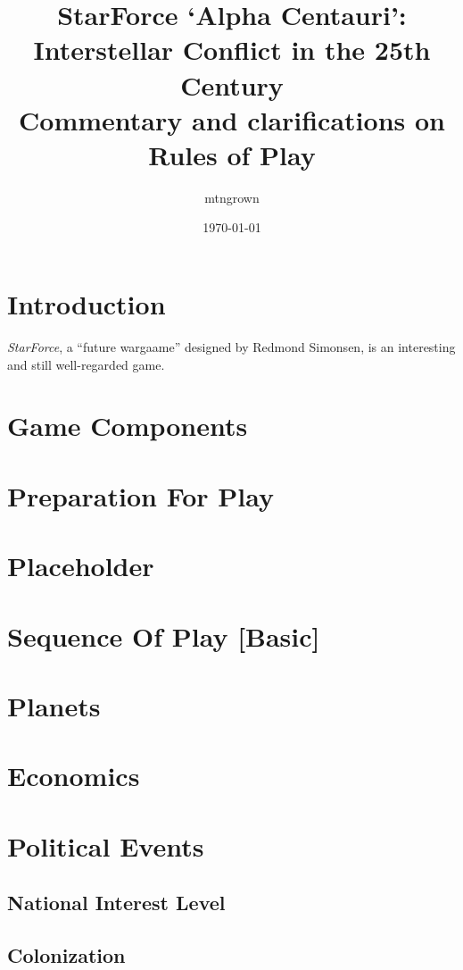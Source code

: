 \documentclass[10pt]{article}
\title{StarForce `Alpha Centauri': Interstellar Conflict in the 25th Century\\
\vspace{2 mm} {\Large Commentary and clarifications on Rules of Play}}
\date{\today}
\author{mtngrown}
\def\sf{{\em StarForce}}
\begin{document}
\maketitle

\tableofcontents

\begin{multicols}{2}

\section{Introduction}

\sf, a ``future wargaame'' designed by Redmond Simonsen, is an interesting
and still well-regarded game.

\section{Game Components}
\section{Preparation For Play}
\section{Placeholder}
\section{Sequence Of Play [Basic]}
\section{Planets}
\section{Economics}
\section{Political Events}
\subsection{National Interest Level}
\subsection{Colonization}


\end{multicols}
\end{document}
